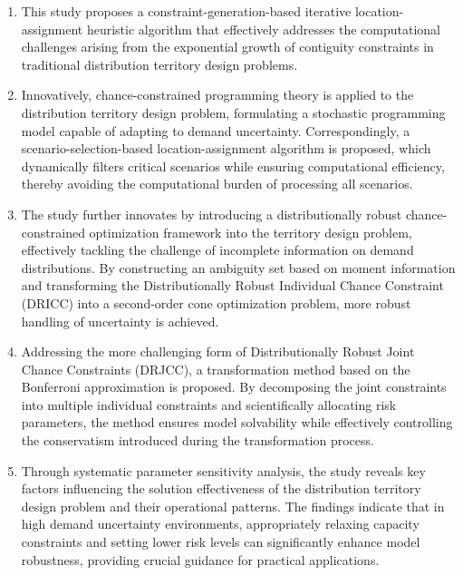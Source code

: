 \documentclass[preprint,12pt,authoryear]{elsarticle}
\begin{document}
\begin{enumerate}[(1)]
    \item This study proposes a constraint-generation-based iterative location-assignment heuristic algorithm that effectively addresses the computational challenges arising from the exponential growth of contiguity constraints in traditional distribution territory design problems.

    \item Innovatively, chance-constrained programming theory is applied to the distribution territory design problem, formulating a stochastic programming model capable of adapting to demand uncertainty. Correspondingly, a scenario-selection-based location-assignment algorithm is proposed, which dynamically filters critical scenarios while ensuring computational efficiency, thereby avoiding the computational burden of processing all scenarios.

    \item The study further innovates by introducing a distributionally robust chance-constrained optimization framework into the territory design problem, effectively tackling the challenge of incomplete information on demand distributions. By constructing an ambiguity set based on moment information and transforming the Distributionally Robust Individual Chance Constraint (DRICC) into a second-order cone optimization problem, more robust handling of uncertainty is achieved.

    \item Addressing the more challenging form of Distributionally Robust Joint Chance Constraints (DRJCC), a transformation method based on the Bonferroni approximation is proposed. By decomposing the joint constraints into multiple individual constraints and scientifically allocating risk parameters, the method ensures model solvability while effectively controlling the conservatism introduced during the transformation process.

    \item Through systematic parameter sensitivity analysis, the study reveals key factors influencing the solution effectiveness of the distribution territory design problem and their operational patterns. The findings indicate that in high demand uncertainty environments, appropriately relaxing capacity constraints and setting lower risk levels can significantly enhance model robustness, providing crucial guidance for practical applications.
\end{enumerate}
\end{document}
